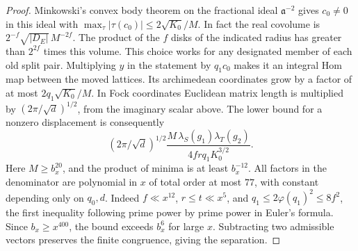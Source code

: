 \documentclass[a4paper,11pt]{article}
\theoremstyle{definition}
\theoremstyle{remark}
\numberwithin{equation}{section}
\begin{document}
\begin{proof}
Minkowski's convex body theorem on the fractional ideal
\(\mathfrak a^{-2}\) gives \(c_0\ne0\) in this ideal with
\(\max_\tau|\tau(c_0)|\le 2\sqrt{K_0}/M\).
In fact the real covolume is
\(2^{-f}\sqrt{|D_E|}\,M^{-2f}\).
The product of the \(f\) disks of the indicated radius
has greater than \(2^{2f}\) times this volume. This choice
works for any designated member of each old split pair.
Multiplying \(y\) in the statement by \(q_1c_0\) makes it
an integral Hom map between the moved lattices. Its
archimedean coordinates grow by a factor of at most
\(2q_1\sqrt{K_0}/M\). In Fock coordinates Euclidean
matrix length is multiplied by
\((2\pi/\sqrt d)^{1/2}\), from the imaginary scalar above.
The lower bound for a nonzero displacement is consequently
\[
       (2\pi/\sqrt d)^{1/2}
       \frac{M\,\lambda_S(g_1)\lambda_T(g_2)}
            {4 f r q_1 K_0^{3/2}} .
\]
Here \(M\ge b_x^{20}\), and the product of minima is
at least \(b_x^{-12}\). All factors in the denominator
are polynomial in \(x\) of total order at most \(77\),
with constant depending only on \(q_0,d\). Indeed
\(f\ll x^{12}\), \(r\le t\ll x^5\), and
\(q_1\le2\varphi(q_1)^2\le 8 f^2\), the first inequality
following prime power by prime power in Euler's formula.
Since \(b_x\ge x^{400}\), the bound exceeds \(b_x^6\)
for large \(x\). Subtracting two admissible vectors
preserves the finite congruence, giving the separation.
\end{proof}
\end{document}

